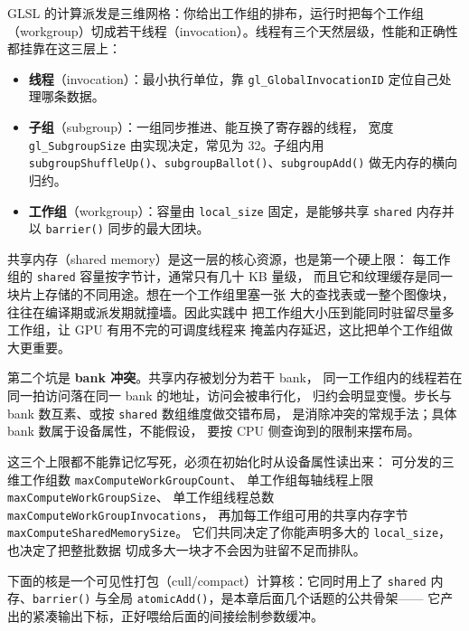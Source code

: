 \documentclass[12pt,a4paper,fontset=fandol]{ctexbook}
\newcommand{\Fn}[1]{\texttt{#1()}}
\newcommand{\Tp}[1]{\texttt{#1}}
\newcommand{\Bk}{\discretionary{}{}{}}
\newcommand{\Lang}[1]{\textsf{#1}}
\newcommand{\DomCPU}{\Lang{CPU}}
\newcommand{\DomGPU}{\Lang{GPU}}
\newcommand{\GSL}{\Lang{GLSL}}
\begin{document}
\GSL{} 的计算派发是三维网格：你给出工作组的排布，运行时把每个工作组
（workgroup）切成若干线程（invocation）。线程有三个天然层级，性能和正确性都挂靠在这三层上：

\begin{itemize}
  \item \textbf{线程}（invocation）：最小执行单位，靠 \Tp{gl\_GlobalInvocationID}
        定位自己处理哪条数据。
  \item \textbf{子组}（subgroup）：一组同步推进、能互换了寄存器的线程，
        宽度 \Tp{gl\_{\Bk}Subgroup{\Bk}Size} 由实现决定，常见为 32。子组内用
        \Fn{subgroup{\Bk}Shuffle{\Bk}Up}、\Fn{subgroup{\Bk}Ballot}、\Fn{subgroupAdd} 做无内存的横向归约。
  \item \textbf{工作组}（workgroup）：容量由 \Tp{local\_size} 固定，是能够共享
        \Tp{shared} 内存并以 \Fn{barrier} 同步的最大团块。
\end{itemize}

共享内存（shared memory）是这一层的核心资源，也是第一个硬上限：
每工作组的 \Tp{shared} 容量按字节计，通常只有几十 KB 量级，
而且它和纹理缓存是同一块片上存储的不同用途。想在一个工作组里塞一张
大的查找表或一整个图像块，往往在编译期或派发期就撞墙。因此实践中
把工作组大小压到能同时驻留尽量多工作组，让 \DomGPU{} 有用不完的可调度线程来
掩盖内存延迟，这比把单个工作组做大更重要。

第二个坑是 \textbf{bank 冲突}。共享内存被划分为若干 bank，
同一工作组内的线程若在同一拍访问落在同一 bank 的地址，访问会被串行化，
归约会明显变慢。步长与 bank 数互素、或按 \Tp{shared} 数组维度做交错布局，
是消除冲突的常规手法；具体 bank 数属于设备属性，不能假设，
要按 \DomCPU{} 侧查询到的限制来摆布局。

这三个上限都不能靠记忆写死，必须在初始化时从设备属性读出来：
可分发的三维工作组数 \Tp{max\Bk Compute\Bk Work\Bk Group\Bk Count}、
单工作组每轴线程上限 \Tp{max\Bk Compute\Bk Work\Bk Group\Bk Size}、
单工作组线程总数 \Tp{max\Bk Compute\Bk Work\Bk Group\Bk Invocations}，
再加每工作组可用的共享内存字节 \Tp{max\Bk Compute\Bk Shared\Bk Memory\Bk Size}。
它们共同决定了你能声明多大的 \Tp{local\_size}，也决定了把整批数据
切成多大一块才不会因为驻留不足而排队。

下面的核是一个可见性打包（cull/compact）计算核：它同时用上了 \Tp{shared}
内存、\Fn{barrier} 与全局 \Fn{atomicAdd}，是本章后面几个话题的公共骨架——
它产出的紧凑输出下标，正好喂给后面的间接绘制参数缓冲。
\end{document}
